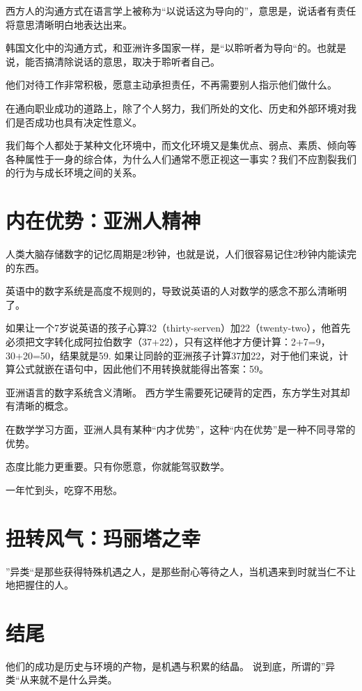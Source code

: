 \documentclass{ctexbook}
\begin{document}
西方人的沟通方式在语言学上被称为“以说话这为导向的”，意思是，说话者有责任将意思清晰明白地表达出来。

韩国文化中的沟通方式，和亚洲许多国家一样，是“以聆听者为导向“的。也就是说，能否搞清除说话的意思，取决于聆听者自己。


他们对待工作非常积极，愿意主动承担责任，不再需要别人指示他们做什么。

在通向职业成功的道路上，除了个人努力，我们所处的文化、历史和外部环境对我们是否成功也具有决定性意义。

我们每个人都处于某种文化环境中，而文化环境又是集优点、弱点、素质、倾向等各种属性于一身的综合体，为什么人们通常不愿正视这一事实？我们不应割裂我们的行为与成长环境之间的关系。

\chapter{内在优势：亚洲人精神}

人类大脑存储数字的记忆周期是2秒钟，也就是说，人们很容易记住2秒钟内能读完的东西。

英语中的数字系统是高度不规则的，导致说英语的人对数学的感念不那么清晰明了。


如果让一个7岁说英语的孩子心算32（thirty-serven）加22（twenty-two），他首先必须把文字转化成阿拉伯数字（37+22），只有这样他才方便计算：2+7=9，30+20=50，结果就是59.
如果让同龄的亚洲孩子计算37加22，对于他们来说，计算公式就嵌在语句中，因此他们不用转换就能得出答案：59。

亚洲语言的数字系统含义清晰。
西方学生需要死记硬背的定西，东方学生对其却有清晰的概念。


在数学学习方面，亚洲人具有某种“内才优势”，这种“内在优势”是一种不同寻常的优势。


态度比能力更重要。只有你愿意，你就能驾驭数学。

一年忙到头，吃穿不用愁。


\chapter{扭转风气：玛丽塔之幸}

”异类“是那些获得特殊机遇之人，是那些耐心等待之人，当机遇来到时就当仁不让地把握住的人。


\chapter{结尾}


他们的成功是历史与环境的产物，是机遇与积累的结晶。
说到底，所谓的”异类“从来就不是什么异类。






\backmatter
\listoftables
\listoffigures


\end{document}
